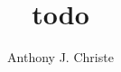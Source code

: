 \documentclass[11pt, draft, dissertation, proposal]{uhthesis}
\title{todo}
\author{Anthony J. Christe}
\begin{document}
  \maketitle

  \begin{frontmatter}


    \copyrightpage

    


    

    \tableofcontents

    \listoftables

    \listoffigures

  \end{frontmatter}

  
  
  
  
  
  
  

  \appendix

  

  \nocite{*}

  
  
\end{document}
